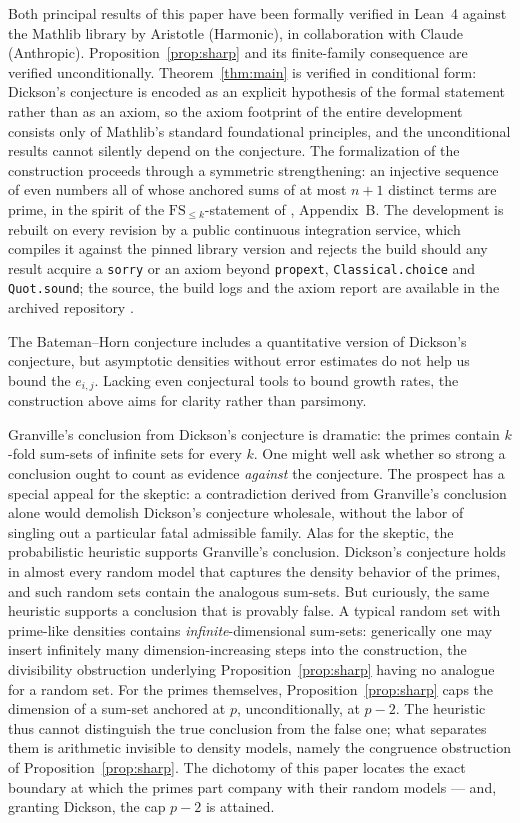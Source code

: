 \documentclass[11pt]{amsart}
\theoremstyle{remark}
\begin{document}
Both principal results of this paper have been formally verified in
Lean~4 against the Mathlib library by Aristotle (Harmonic), in
collaboration with Claude (Anthropic).
Proposition~\ref{prop:sharp} and its finite-family consequence are
verified unconditionally.  Theorem~\ref{thm:main} is verified in
conditional form: Dickson's conjecture is encoded as an explicit
hypothesis of the formal statement rather than as an axiom, so the
axiom footprint of the entire development consists only of Mathlib's
standard foundational principles, and the unconditional results
cannot silently depend on the conjecture.  The formalization of the
construction proceeds through a symmetric strengthening: an injective
sequence of even numbers all of whose anchored sums of at most $n+1$
distinct terms are prime, in the spirit of the $\mathrm{FS}_{\le
k}$-statement of \cite{KMRRsurvey}, Appendix~B.
The development is rebuilt on every revision by a public continuous
integration service, which compiles it against the pinned library
version and rejects the build should any result acquire a
\texttt{sorry} or an axiom beyond \texttt{propext},
\texttt{Classical.choice} and \texttt{Quot.sound}; the source, the
build logs and the axiom report are available in the archived
repository \cite{Repo}.

The Bateman--Horn conjecture \cite{BatemanHorn} includes a
quantitative version of Dickson's conjecture, but asymptotic densities
without error estimates do not help us bound the $e_{i,j}$.  Lacking
even conjectural tools to bound growth rates, the construction above
aims for clarity rather than parsimony.

Granville's conclusion from Dickson's conjecture is dramatic: the
primes contain $k$-fold sum-sets of infinite sets for every $k$.  One
might well ask whether so strong a conclusion ought to count as
evidence \emph{against} the conjecture.  The prospect has a special
appeal for the skeptic: a contradiction derived from Granville's
conclusion alone would demolish Dickson's conjecture wholesale,
without the labor of singling out a particular fatal admissible
family.  Alas for the skeptic, the probabilistic heuristic supports
Granville's conclusion.  Dickson's conjecture holds in almost every
random model that captures the density behavior of the primes, and
such random sets contain the analogous sum-sets.  But curiously, the
same heuristic supports a conclusion that is provably false.  A
typical random set with prime-like densities contains
\emph{infinite}-dimensional sum-sets: generically one may insert
infinitely many dimension-increasing steps into the construction,
the divisibility obstruction underlying
Proposition~\ref{prop:sharp} having no analogue for a random set.
For the primes themselves, Proposition~\ref{prop:sharp} caps the
dimension of a sum-set anchored at $p$, unconditionally, at $p-2$.
The heuristic thus cannot distinguish the true conclusion from the
false one; what separates them is arithmetic invisible to density
models, namely the congruence obstruction of
Proposition~\ref{prop:sharp}.  The dichotomy of this paper locates
the exact boundary at which the primes part company with their random
models --- and, granting Dickson, the cap $p-2$ is attained.
\end{document}
